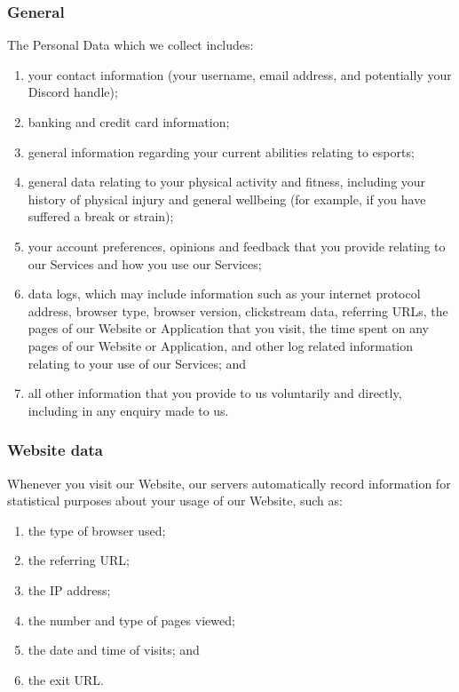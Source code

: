 \documentclass[10pt]{article}
\begin{document}
\subsubsection{General}
The Personal Data which we collect includes:
\begin{enumerate}[(1)]
	\item your contact information (your username, email address, and potentially your Discord handle);

	\item banking and credit card information;

	\item general information regarding your current abilities relating to esports;

	\item general data relating to your physical activity and fitness, including your history of physical injury and general wellbeing (for example, if you have suffered a break or strain);

	\item your account preferences, opinions and feedback that you provide relating to our Services and how you use our Services;

	\item data logs, which may include information such as your internet protocol address, browser type, browser version, clickstream data, referring URLs, the pages of our Website or Application that you visit, the time spent on any pages of our Website or Application, and other log related information relating to your use of our Services; and

	\item all other information that you provide to us voluntarily and directly, including in any enquiry made to us.
\end{enumerate}

\subsubsection{Website data}
Whenever you visit our Website, our servers automatically record information for statistical purposes about your usage of our Website, such as:
\begin{enumerate}[(1)]
	\item the type of browser used;

	\item the referring URL;

	\item the IP address;

	\item the number and type of pages viewed;

	\item the date and time of visits; and

	\item the exit URL.
\end{enumerate}
\end{document}
